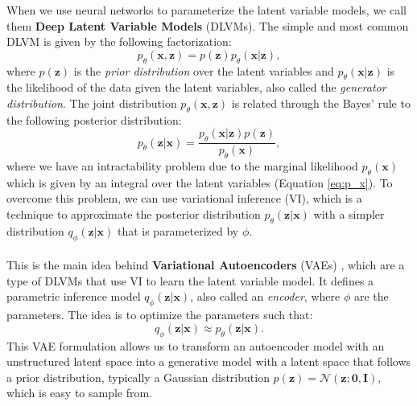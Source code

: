When we use neural networks to parameterize the latent variable models, we call them \textbf{Deep Latent Variable Models} (DLVMs). 
The simple and most common DLVM is given by the following factorization:
\begin{equation}
    p_{\theta}(\mathbf{x}, \mathbf{z}) = p(\mathbf{z}) p_{\theta}(\mathbf{x} | \mathbf{z}),
\end{equation}
where $p(\mathbf{z})$ is the \textit{prior distribution} over the latent variables and $p_{\theta}(\mathbf{x} | \mathbf{z})$ 
is the likelihood of the data given the latent variables, also called the \textit{generator distribution}. The joint distribution $p_{\theta}(\mathbf{x}, \mathbf{z})$ 
is related through the Bayes' rule to the following posterior distribution:
\begin{equation}
    p_{\theta}(\mathbf{z} | \mathbf{x}) = \frac{p_{\theta}(\mathbf{x} | \mathbf{z}) p(\mathbf{z})}{p_{\theta}(\mathbf{x})},
\end{equation}
where we have an intractability problem due to the marginal likelihood $p_{\theta}(\mathbf{x})$ which is given by an integral over the latent variables (Equation \ref{eq:p_x}). 
To overcome this problem, we can use variational inference (VI), which is a technique to approximate the posterior distribution $p_{\theta}(\mathbf{z} | \mathbf{x})$ 
with a simpler distribution $q_{\phi}(\mathbf{z} | \mathbf{x})$ that is parameterized by $\phi$.  \\
\\
This is the main idea behind \textbf{Variational Autoencoders} (VAEs) \cite{kingma2022autoencodingvariationalbayes}, which are a type of DLVMs that use VI to learn the latent variable model. It defines a 
parametric inference model $q_{\phi}(\mathbf{z} | \mathbf{x})$, also called an \textit{encoder}, where $\phi$ are the parameters. The idea is to optimize the parameters such that: 
\begin{equation}
    q_{\phi}(\mathbf{z} | \mathbf{x}) \approx p_{\theta}(\mathbf{z} | \mathbf{x}).
\end{equation}
This VAE formulation allows us to transform an autoencoder model with an unstructured latent space into a generative model with a latent space that follows a prior 
distribution, typically a Gaussian distribution $p(\mathbf{z}) = \mathcal{N}(\mathbf{z}; \mathbf{0}, \mathbf{I})$, which is easy to sample from. \\

